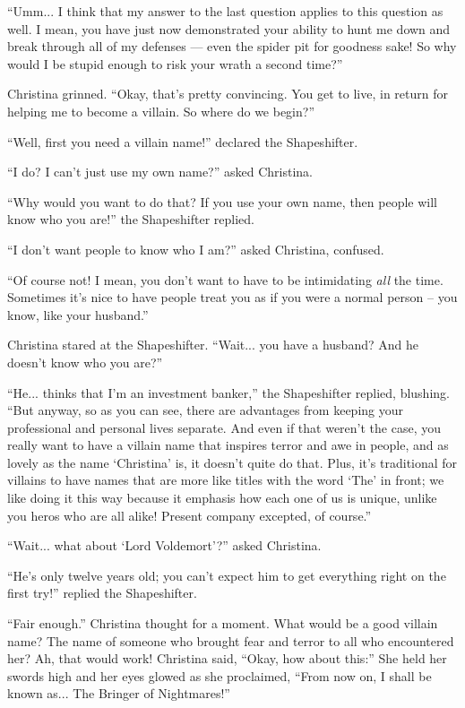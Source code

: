 \documentclass[showtrims,b6paper,draft,10pt]{memoir}
\begin{document}
``Umm... I think that my answer to the last question applies to this question as well.  I mean, you have just now demonstrated your ability to hunt me down and break through all of my defenses --- even the spider pit for goodness sake!  So why would I be stupid enough to risk your wrath a second time?''

Christina grinned.  ``Okay, that's pretty convincing.  You get to live, in return for helping me to become a villain.  So where do we begin?''

``Well, first you need a villain name!'' declared the Shapeshifter.

``I do?  I can't just use my own name?'' asked Christina.

``Why would you want to do that?  If you use your own name, then people will know who you are!'' the Shapeshifter replied.

``I don't want people to know who I am?'' asked Christina, confused.

``Of course not!  I mean, you don't want to have to be intimidating \emph{all} the time.  Sometimes it's nice to have people treat you as if you were a normal person -- you know, like your husband.''

Christina stared at the Shapeshifter.  ``Wait... you have a husband?  And he doesn't know who you are?''

``He... thinks that I'm an investment banker,'' the Shapeshifter replied, blushing.  ``But anyway, so as you can see, there are advantages from keeping your professional and personal lives separate.  And even if that weren't the case, you really want to have a villain name that inspires terror and awe in people, and as lovely as the name `Christina' is, it doesn't quite do that.  Plus, it's traditional for villains to have names that are more like titles with the word `The' in front;  we like doing it this way because it emphasis how each one of us is unique, unlike you heros who are all alike!  Present company excepted, of course.''

``Wait... what about `Lord Voldemort'?'' asked Christina.

``He's only twelve years old;  you can't expect him to get everything right on the first try!'' replied the Shapeshifter.

``Fair enough.''  Christina thought for a moment.  What would be a good villain name?  The name of someone who brought fear and terror to all who encountered her?  Ah, that would work!  Christina said, ``Okay, how about this:''  She held her swords high and her eyes glowed as she proclaimed,  ``From now on, I shall be known as... The Bringer of Nightmares!''
\end{document}
